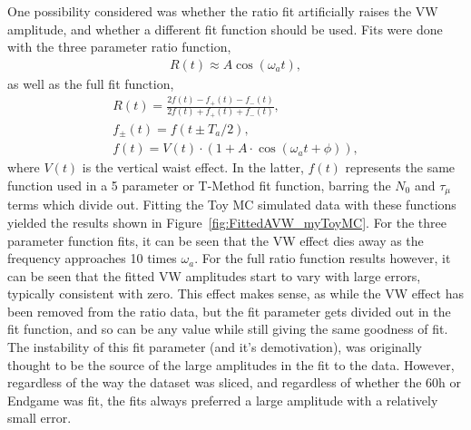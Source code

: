 \documentclass[12pt,letterpaper]{article}
\newcommand{\figref}[1]{Figure~\ref{#1}}
\def\wa{$\omega_{a}$\xspace}
\begin{document}
One possibility considered was whether the ratio fit artificially raises the VW amplitude, and whether a different fit function should be used. Fits were done with the three parameter ratio function,
    \begin{align} \label{eq:threeparamratio}
        R(t) \approx A \cos(\omega_{a}t),
    \end{align}
as well as the full fit function,
    \begin{gather}
        R(t) = \frac{2f(t) - f_{+}(t) - f_{-}(t)}{2f(t) + f_{+}(t) + f_{-}(t)}, \\
        f_{\pm}(t) = f(t \pm T_{a}/2), \\
        f(t) = V(t) \cdot (1 + A \cdot \cos(\omega_{a}t + \phi)),
    \label{eq:fullratiofunction}
    \end{gather}
where $V(t)$ is the vertical waist effect. In the latter, $f(t)$ represents the same function used in a 5 parameter or T-Method fit function, barring the $N_{0}$ and $\tau_{\mu}$ terms which divide out. Fitting the Toy MC simulated data with these functions yielded the results shown in \figref{fig:FittedAVW_myToyMC}. For the three parameter function fits, it can be seen that the VW effect dies away as the frequency approaches 10 times \wa. For the full ratio function results however, it can be seen that the fitted VW amplitudes start to vary with large errors, typically consistent with zero. This effect makes sense, as while the VW effect has been removed from the ratio data, but the fit parameter gets divided out in the fit function, and so can be any value while still giving the same goodness of fit. The instability of this fit parameter (and it's demotivation), was originally thought to be the source of the large amplitudes in the fit to the data. However, regardless of the way the dataset was sliced, and regardless of whether the 60h or Endgame was fit, the fits always preferred a large amplitude with a relatively small error.
\end{document}
